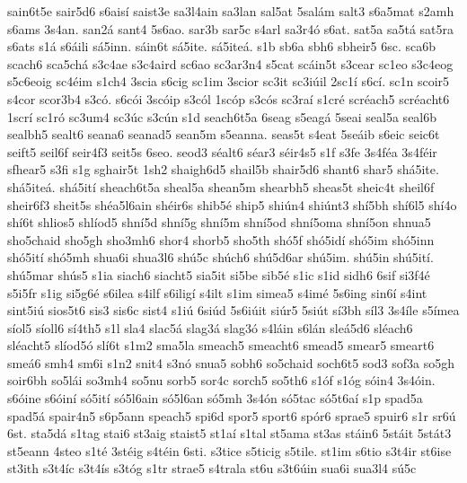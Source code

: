 {sain6t5e
sair5d6
s6ais^^ed
saist3e
sa3l4ain
sa3lan
sal5at
5sal^^e1m
salt3
s6a5mat
s2amh
s6ams
3s4an.
san2^^e1
sant4
5s6ao.
sar3b
sar5c
s4arl
sa3r4^^f3
s6at.
sat5a
sa5t^^e1
sat5ra
s6ats
s1^^e1
s6^^e1ili
s^^e15inn.
s^^e1in6t
s^^e15ite.
s^^e15ite^^e1.
s1b
sb6a
sbh6
sbheir5
6sc.
sca6b
scach6
sca5ch^^e1
s3c4ae
s3c4aird
sc6ao
sc3ar3n4
s5cat
sc^^e1in5t
s3cear
sc1eo
s3c4eog
s5c6eoig
sc4^^e9im
s1ch4
3scia
s6cig
sc1im
3scior
sc3it
sc3i^^fail
2sc1^^ed
s6c^^ed.
sc1n
scoir5
s4cor
scor3b4
s3c^^f3.
s6c^^f3i
3sc^^f3ip
s3c^^f3l
1sc^^f3p
s3c^^f3s
sc3ra^^ed
s1cr^^e9
scr^^e9ach5
scr^^e9acht6
1scr^^ed
sc1r^^f3
sc3um4
sc3^^fac
s3c^^fan
s1d
seach6t5a
6seag
s5eag^^e1
5seai
seal5a
seal6b
sealbh5
sealt6
seana6
seanad5
sean5m
s5eanna.
seas5t
s4eat
5se^^e1ib
s6eic
seic6t
seift5
seil6f
seir4f3
seit5s
6seo.
seod3
s^^e9alt6
s^^e9ar3
s^^e9ir4s5
s1f
s3fe
3s4f^^e9a
3s4f^^e9ir
sfhear5
s3fi
s1g
sghair5t
1sh2
shaigh6d5
shail5b
shair5d6
shant6
shar5
sh^^e15ite.
sh^^e15ite^^e1.
sh^^e15it^^ed
sheach6t5a
sheal5a
shean5m
shearbh5
sheas5t
sheic4t
sheil6f
sheir6f3
sheit5s
sh^^e9a5l6ain
sh^^e9ir6s
shib5^^e9
ship5
shi^^fan4
shi^^fant3
sh^^ed5bh
sh^^ed6l5
sh^^ed4o
sh^^ed6t
shlios5
shl^^edod5
shn^^ed5d
shn^^ed5g
shn^^ed5m
shn^^ed5od
shn^^ed5oma
shn^^ed5on
shnua5
sho5chaid
sho5gh
sho3mh6
shor4
shorb5
sho5th
sh^^f35f
sh^^f35id^^ed
sh^^f35im
sh^^f35inn
sh^^f35it^^ed
sh^^f35mh
shua6i
shua3l6
sh^^fa5c
sh^^fach6
sh^^fa5d6ar
sh^^fa5im.
sh^^fa5in
sh^^fa5it^^ed.
sh^^fa5mar
sh^^fas5
s1ia
siach6
siacht5
sia5it
si5be
sib5^^e9
s1ic
s1id
sidh6
6sif
si3f4^^e9
s5i5fr
s1ig
si5g6^^e9
s6ilea
s4ilf
s6ilig^^ed
s4ilt
s1im
simea5
s4im^^e9
5s6ing
sin6^^ed
s4int
sint5i^^fa
sios5t6
sis3
sis6c
sist4
s1i^^fa
6si^^fad
5s6i^^fait
si^^far5
5si^^fat
s^^ed3bh
s^^edl3
3s4^^edle
s5^^edmea
s^^edol5
s^^edoll6
s^^ed4th5
s1l
sla4
slac5^^e1
slag3^^e1
slag3^^f3
s4l^^e1in
s6l^^e1n
sle^^e15d6
sl^^e9ach6
sl^^e9acht5
sl^^edod5^^f3
sl^^ed6t
s1m2
sma5la
smeach5
smeacht6
smead5
smear5
smeart6
sme^^e16
smh4
sm6i
s1n2
snit4
s3n^^f3
snua5
sobh6
so5chaid
soch6t5
sod3
sof3a
so5gh
soir6bh
so5l^^e1i
so3mh4
so5nu
sorb5
sor4c
sorch5
so5th6
s1^^f3f
s1^^f3g
s^^f3in4
3s4^^f3in.
s6^^f3ine
s6^^f3in^^ed
s^^f35it^^ed
s^^f35l6ain
s^^f35l6an
s^^f35mh
3s4^^f3n
s^^f35tac
s^^f35t6a^^ed
s1p
spad5a
spad5^^e1
spair4n5
s6p5ann
speach5
spi6d
spor5
sport6
sp^^f3r6
sprae5
spuir6
s1r
sr6^^fa
6st.
sta5d^^e1
s1tag
stai6
st3aig
staist5
st1a^^ed
s1tal
st5ama
st3as
st^^e1in6
5st^^e1it
5st^^e1t3
st5eann
4steo
s1t^^e9
3st^^e9ig
s4t^^e9in
6sti.
s3tice
s5ticig
s5tile.
st1im
s6tio
s3t4ir
st6ise
st3ith
s3t4^^edc
s3t4^^eds
s3t^^f3g
s1tr
strae5
s4trala
st6u
s3t6^^fain
sua6i
sua3l4
s^^fa5c
}

